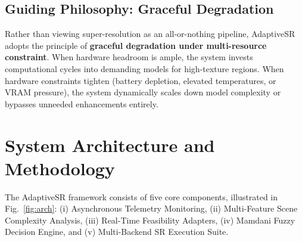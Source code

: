 \documentclass[conference]{IEEEtran}
\begin{document}
\subsection{Guiding Philosophy: Graceful Degradation}
Rather than viewing super-resolution as an all-or-nothing pipeline, AdaptiveSR adopts the principle of \textbf{graceful degradation under multi-resource constraint}. When hardware headroom is ample, the system invests computational cycles into demanding models for high-texture regions. When hardware constraints tighten (battery depletion, elevated temperatures, or VRAM pressure), the system dynamically scales down model complexity or bypasses unneeded enhancements entirely.

\section{System Architecture and Methodology}
The AdaptiveSR framework consists of five core components, illustrated in Fig.~\ref{fig:arch}: (i) Asynchronous Telemetry Monitoring, (ii) Multi-Feature Scene Complexity Analysis, (iii) Real-Time Feasibility Adapters, (iv) Mamdani Fuzzy Decision Engine, and (v) Multi-Backend SR Execution Suite.
\end{document}
